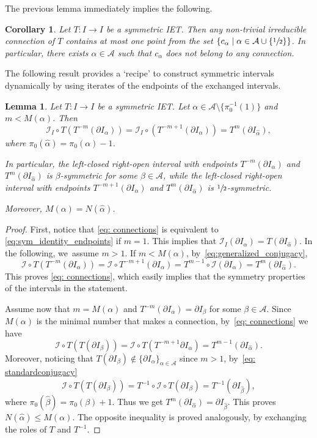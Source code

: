 \documentclass[JEP,XML,SOM,Unicode,NoEqCountersInSection,NoFloatCountersInSection,published]{cedram}
\theoremstyle{plain}
\newtheorem{lemma}[theorem]{Lemma}
\newtheorem{corollary}[theorem]{Corollary}
\theoremstyle{definition}
\newcommand{\A}{\mathcal{A}}
\newcommand{\I}{\mathcal{I}}
\begin{document}
The previous lemma immediately implies the following.

\begin{corollary}
\label{cor:centers_connections}
Let $T: I \to I$ be a symmetric IET. Then any non-trivial irreducible connection of $T$ contains at most one point from the set $\left\{c_\alpha \mid \alpha \in \A \cup \{\sfrac{1}{2}\} \right\}$. In particular, there exists $\alpha \in \A$ such that $c_\alpha$ does not belong to any connection.
\end{corollary}

The following result provides a `recipe' to construct symmetric intervals dynamically by using iterates of the endpoints of the exchanged intervals.

\begin{lemma}\label{lem: sym_endpoints}
{Let $T : I \to I$ be a symmetric IET.}
Let $\alpha\in\mathcal A\setminus\{\pi_0^{-1}(1)\}$ and $m< M(\alpha)$. Then
\begin{equation}\label{eq: connections}
\I_I\circ T(T^{-m}(\partial I_{\alpha}))={\I_I\circ (T^{-m+1}(\partial I_{\alpha}))}=T^m(\partial I_{\hat\alpha}),
\end{equation}
where $\pi_0(\hat\alpha)=\pi_0(\alpha)-1$.

In particular, the left-closed right-open interval with endpoints $T^{-m}(\partial I_{\alpha})$ and $T^m(\partial I_{\hat\alpha})$ is {$\beta$-symmetric for some $\beta\in\A$, while the left-closed right-open interval with endpoints $T^{-m+1}(\partial I_{\alpha})$ and $T^m(\partial I_{\hat\alpha})$ is $\sfrac{1}{2}$-symmetric}.

Moreover, $M(\alpha)= N(\hat\alpha)$.
\end{lemma}

\begin{proof}
First, notice that \eqref{eq: connections} is equivalent to \eqref{eq:sym_identity_endpoints} if $m = 1$. This implies that $\I_I(\partial I_\alpha) = T(\partial I_{\hat\alpha})$.
In the following, we~assume $m > 1$. If $m < M(\alpha)$, by~\eqref{eq:generalized_conjugacy},
\[
\I\circ T(T^{-m}(\partial I_{\alpha}))= \I \circ T^{-m + 1}(\partial I_\alpha) = T^{m - 1} \circ \I (\partial I_\alpha) = T^m(\partial I_{\hat \alpha}).
\]
This proves \eqref{eq: connections}, which easily implies that the symmetry properties of the intervals in the statement.

Assume now that $m=M(\alpha)$ and $T^{-m}(\partial I_{\alpha})=\partial I_{\beta}$ for some $\beta\in \A$. Since $M(\alpha)$ is the minimal number that makes a connection, by~\eqref{eq: connections} we have
\[
\I\circ T(T(\partial I_{\beta}))=\I\circ T(T^{-{m+1}}\partial I_{\alpha})=T^{m-1}(\partial I_{\hat\alpha}).
\]
Moreover, noticing that $T(\partial I_\beta) \notin \{\partial I_\alpha\}_{\alpha \in \A}$ since $m > 1$, by~\eqref{eq: standardconjugacy}
\[
\I\circ T(T(\partial I_{\beta}))=T^{-1}\circ\I\circ T(\partial I_{\beta})
=T^{-1}(\partial I_{\hat\beta}),
\]
where $\pi_0(\hat\beta)=\pi_0(\beta)+1$. Thus we get $T^{m}(\partial I_{\hat\alpha})=\partial I_{\hat\beta}$. This proves $N(\hat\alpha)\le M(\alpha)$. The opposite inequality is proved analogously, {by exchanging the roles of $T$ and $T^{-1}$.}
\end{proof}
\end{document}
